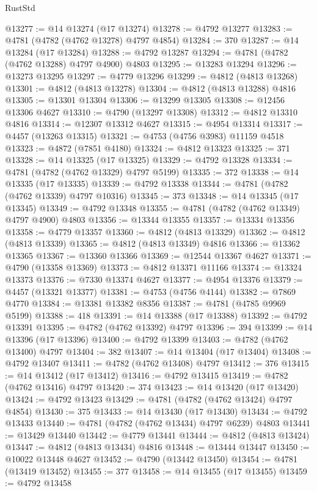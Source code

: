 \begin{lexlean}{RustStd}
\begin{coremodule}
@13277 := @14 @13274 (@17 @13274)
@13278 := @4792 @13277
@13283 := @4781 (@4782 (@4762 @13278) @4797 @4854)
@13284 := 370
@13287 := @14 @13284 (@17 @13284)
@13288 := @4792 @13287
@13294 := @4781 (@4782 (@4762 @13288) @4797 @4900) @4803
@13295 := @13283 @13294
@13296 := @13273 @13295
@13297 := @4779 @13296
@13299 := @4812 (@4813 @13268)
@13301 := @4812 (@4813 @13278)
@13304 := @4812 (@4813 @13288) @4816
@13305 := @13301 @13304
@13306 := @13299 @13305
@13308 := @12456 @13306 @4627
@13310 := @4790 (@13297 @13308)
@13312 := @4812 @13310 @4816
@13314 := @12307 @13312 @4627
@13315 := @4954 @13314
@13317 := @4457 (@13263 @13315)
@13321 := @4753 (@4756 @3983) @11159 @4518
@13323 := @4872 (@7851 @4180)
@13324 := @4812 @13323
@13325 := 371
@13328 := @14 @13325 (@17 @13325)
@13329 := @4792 @13328
@13334 := @4781 (@4782 (@4762 @13329) @4797 @5199)
@13335 := 372
@13338 := @14 @13335 (@17 @13335)
@13339 := @4792 @13338
@13344 := @4781 (@4782 (@4762 @13339) @4797 @10316)
@13345 := 373
@13348 := @14 @13345 (@17 @13345)
@13349 := @4792 @13348
@13355 := @4781 (@4782 (@4762 @13349) @4797 @4900) @4803
@13356 := @13344 @13355
@13357 := @13334 @13356
@13358 := @4779 @13357
@13360 := @4812 (@4813 @13329)
@13362 := @4812 (@4813 @13339)
@13365 := @4812 (@4813 @13349) @4816
@13366 := @13362 @13365
@13367 := @13360 @13366
@13369 := @12544 @13367 @4627
@13371 := @4790 (@13358 @13369)
@13373 := @4812 @13371 @11166
@13374 := @13324 @13373
@13376 := @7330 @13374 @4627
@13377 := @4954 @13376
@13379 := @4457 (@13321 @13377)
@13381 := @4753 (@4756 @4144)
@13382 := @7869 @4770
@13384 := @13381 @13382 @8356
@13387 := @4781 (@4785 @9969 @5199)
@13388 := 418
@13391 := @14 @13388 (@17 @13388)
@13392 := @4792 @13391
@13395 := @4782 (@4762 @13392) @4797
@13396 := 394
@13399 := @14 @13396 (@17 @13396)
@13400 := @4792 @13399
@13403 := @4782 (@4762 @13400) @4797
@13404 := 382
@13407 := @14 @13404 (@17 @13404)
@13408 := @4792 @13407
@13411 := @4782 (@4762 @13408) @4797
@13412 := 376
@13415 := @14 @13412 (@17 @13412)
@13416 := @4792 @13415
@13419 := @4782 (@4762 @13416) @4797
@13420 := 374
@13423 := @14 @13420 (@17 @13420)
@13424 := @4792 @13423
@13429 := @4781 (@4782 (@4762 @13424) @4797 @4854)
@13430 := 375
@13433 := @14 @13430 (@17 @13430)
@13434 := @4792 @13433
@13440 := @4781 (@4782 (@4762 @13434) @4797 @6239) @4803
@13441 := @13429 @13440
@13442 := @4779 @13441
@13444 := @4812 (@4813 @13424)
@13447 := @4812 (@4813 @13434) @4816
@13448 := @13444 @13447
@13450 := @10022 @13448 @4627
@13452 := @4790 (@13442 @13450)
@13454 := @4781 (@13419 @13452)
@13455 := 377
@13458 := @14 @13455 (@17 @13455)
@13459 := @4792 @13458

\end{coremodule}
\end{lexlean}
